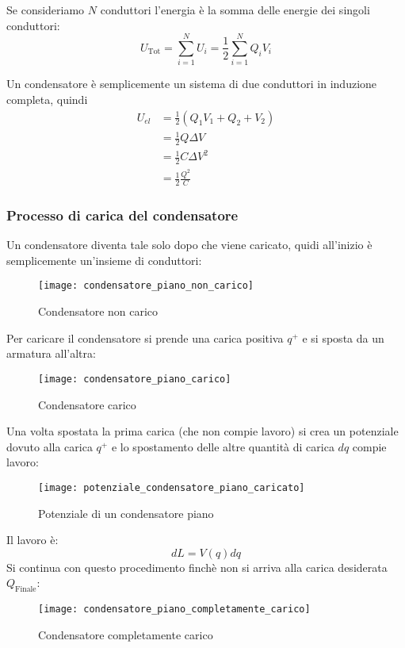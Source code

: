 \documentclass[a4paper]{article}
\begin{document}
\vspace{1em}
\noindent
Se consideriamo \( N \) conduttori l'energia è la somma delle energie dei singoli
conduttori:
\[
  U_{\text{Tot}} = \sum_{i=1}^N U_i = \frac{1}{2} \sum_{i=1}^N Q_i V_i
\] 

\vspace{1em}
\noindent
Un condensatore è semplicemente un sistema di due conduttori in induzione completa, quindi
\[
  \begin{aligned}
    U_{el} &= \frac{1}{2} (Q_1 V_1 + Q_2 + V_2)\\
    &= \frac{1}{2} Q \Delta V \\
    &= \frac{1}{2} C \Delta V^2 \\
    &= \frac{1}{2} \frac{Q^2}{C} \
  \end{aligned}
\] 

\subsubsection{Processo di carica del condensatore}
Un condensatore diventa tale solo dopo che viene caricato, quidi all'inizio è
semplicemente un'insieme di conduttori:
\begin{figure}[H]
  \centering
  \texttt{[image: condensatore\_piano\_non\_carico]}
  \caption{Condensatore non carico}
\end{figure}
\noindent
Per caricare il condensatore si prende una carica positiva \( q^+ \) e si sposta
da un armatura all'altra:
\begin{figure}[H]
  \centering
  \texttt{[image: condensatore\_piano\_carico]}
  \caption{Condensatore carico}
\end{figure}
\noindent
Una volta spostata la prima carica (che non compie lavoro) si crea un potenziale
dovuto alla carica \( q^+ \) e lo spostamento delle altre quantità di carica
\( dq \) compie lavoro:
\begin{figure}[H]
  \centering
  \texttt{[image: potenziale\_condensatore\_piano\_caricato]}
  \caption{Potenziale di un condensatore piano}
\end{figure}
\noindent
Il lavoro è:
\[
  dL = V(q) dq
\] 
Si continua con questo procedimento finchè non si arriva alla carica desiderata
\( Q_{\text{Finale}} \):
\begin{figure}[H]
  \centering
  \texttt{[image: condensatore\_piano\_completamente\_carico]}
  \caption{Condensatore completamente carico}
\end{figure}
\end{document}
